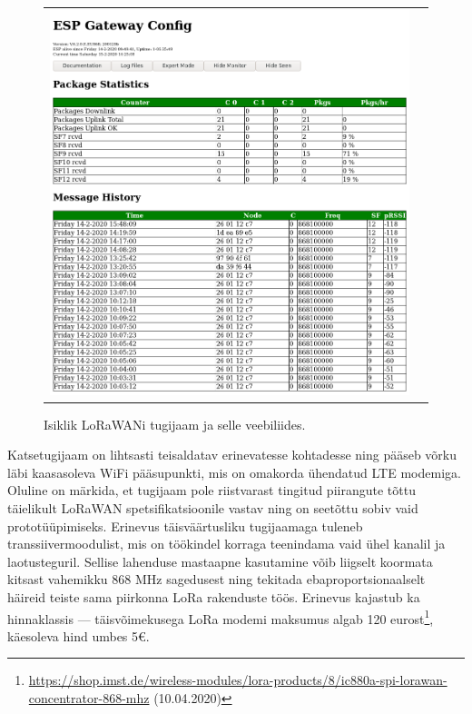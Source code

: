 \documentclass[12pt]{article}
\begin{document}
\begin{figure} [htbp]
\begin{tabular}{c c}
\begin{minipage}{0.53\textwidth}
                \includegraphics[width=\textwidth]{figures/ttn-jaama-liides.png}
            \end{minipage}
        \end{tabular}
        \caption{Isiklik LoRaWANi tugijaam ja selle veebiliides.}
        \label{fig:omatugijaam}
    \end{figure}

    Katsetugijaam on lihtsasti teisaldatav erinevatesse kohtadesse ning pääseb võrku läbi kaasasoleva WiFi pääsupunkti, mis on omakorda ühendatud LTE modemiga.
    Oluline on märkida, et tugijaam pole riistvarast tingitud piirangute tõttu täielikult LoRaWAN spetsifikatsioonile vastav ning on seetõttu sobiv vaid prototüüpimiseks.
    Erinevus täisväärtusliku tugijaamaga tuleneb transsiivermoodulist, mis on töökindel korraga teenindama vaid ühel kanalil ja laotusteguril.
    Sellise lahenduse mastaapne kasutamine võib liigselt koormata kitsast vahemikku 868 MHz sagedusest ning tekitada ebaproportsionaalselt häireid teiste sama piirkonna LoRa rakenduste töös.
    Erinevus kajastub ka hinnaklassis — täisvõimekusega LoRa modemi maksumus algab 120 eurost\footnote{\url{https://shop.imst.de/wireless-modules/lora-products/8/ic880a-spi-lorawan-concentrator-868-mhz} (10.04.2020)}, käesoleva hind umbes 5€.
\end{document}

